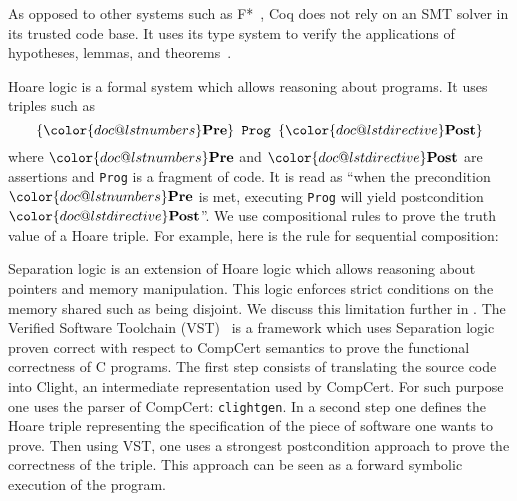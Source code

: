 As opposed to other systems such as F*~\cite{DBLP:journals/corr/BhargavanDFHPRR17},
Coq does not rely on an SMT solver in its trusted code base.
It uses its type system to verify the applications of hypotheses,
lemmas, and theorems~\cite{Howard1995-HOWTFN}.

Hoare logic is a formal system which allows reasoning about programs.
It uses triples such as
$$\{{\color{doc@lstnumbers}\textbf{Pre}}\}\texttt{~Prog~}\{{\color{doc@lstdirective}\textbf{Post}}\}$$
where ${\color{doc@lstnumbers}\textbf{Pre}}$ and ${\color{doc@lstdirective}\textbf{Post}}$
are assertions and \texttt{Prog} is a fragment of code.
It is read as
``when the precondition  ${\color{doc@lstnumbers}\textbf{Pre}}$ is met,
executing \texttt{Prog} will yield postcondition ${\color{doc@lstdirective}\textbf{Post}}$''.
We use compositional rules to prove the truth value of a Hoare triple.
For example, here is the rule for sequential composition:
\begin{prooftree}
\end{prooftree}
Separation logic is an extension of Hoare logic which allows reasoning about
pointers and memory manipulation. This logic enforces strict conditions on the
memory shared such as being disjoint.
We discuss this limitation further in .
The Verified Software Toolchain (VST)~\cite{cao2018vst-floyd} is a framework
which uses Separation logic proven correct with respect to CompCert semantics
to prove the functional correctness of C programs.
The first step consists of translating the source code into Clight,
an intermediate representation used by CompCert.
For such purpose one uses the parser of CompCert: \texttt{clightgen}.
In a second step one defines the Hoare triple representing the specification of
the piece of software one wants to prove. Then using VST, one uses a strongest
postcondition approach to prove the correctness of the triple.
This approach can be seen as a forward symbolic execution of the program.
